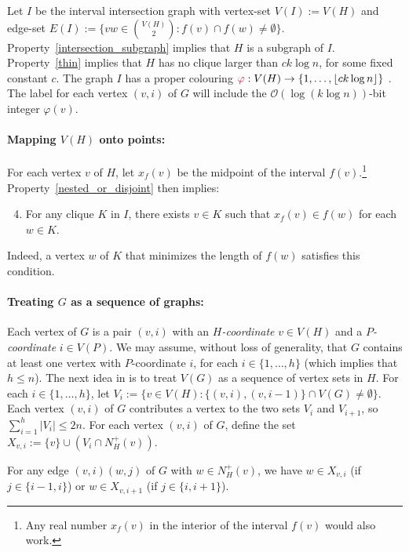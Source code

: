 \documentclass{patmorin}
\makeatletter
\renewcommand{\le}{\leqslant}
\newcommand{\defin}[1]{\emph{\textcolor{brightmaroon}{#1}}}
\def\mathcolor#1#{\@mathcolor{#1}}
\def\@mathcolor#1#2#3{%
  \protect\leavevmode
  \begingroup
    \color#1{#2}#3%
  \endgroup
}
\newcommand{\mathdefin}[1]{\mathcolor{brightmaroon}{#1}}
\newcommand{\Oh}{\mathcal{O}}
\makeatother
\begin{document}
  Let $I$ be the interval intersection graph with vertex-set $V(I):=V(H)$ and edge-set $E(I):=\{vw\in\binom{V(H)}{2}:f(v)\cap f(w)\neq\emptyset\}$.
  Property~\ref{intersection_subgraph} implies that $H$ is a subgraph of $I$. Property~\ref{thin} implies that $H$ has no clique larger than $ck\log n$, for some fixed constant $c$.
  The graph $I$ has a proper colouring $\mathdefin{\varphi}:V(H)\to\{1,\ldots,\lfloor ck\log n\rfloor\}$ \cite{gilmore.hoffman:characterization}.
  The label for each vertex $(v,i)$ of $G$ will include the $\Oh(\log (k\log n))$-bit integer $\varphi(v)$.

  \paragraph{\boldmath Mapping $V(H)$ onto points:}
  For each vertex $v$ of $H$, let $x_f(v)$ be the midpoint of the interval $f(v)$.\footnote{Any real number $x_f(v)$ in the interior of the interval $f(v)$ would also work.}  Property~\ref{nested_or_disjoint} then implies:
  \begin{enumerate}[nosep]\setcounter{enumi}{3}
      \item\label{clique_property} For any clique $K$ in $I$, there exists $v\in K$ such that $x_f(v)\in f(w)$ for each $w\in K$.
  \end{enumerate}
  Indeed, a vertex $w$ of $K$ that minimizes the length of $f(w)$ satisfies this condition.

  \paragraph{\boldmath Treating $G$ as a sequence of graphs:}
  Each vertex of $G$ is a pair $(v,i)$ with an \defin{$H$-coordinate} $v\in V(H)$ and a \defin{$P$-coordinate} $i\in V(P)$.
  We may assume, without loss of generality, that $G$ contains at least one vertex with $P$-coordinate $i$, for each $i\in\{1,\ldots,h\}$ (which implies that $h\le n$).
  The next idea in \cite{dujmovic.esperet.ea:adjacency} is to treat $V(G)$ as a sequence of vertex sets in $H$.
  For each $i\in\{1,\ldots,h\}$, let $V_i:=\{v\in V(H): \{(v,i),(v,i-1)\}\cap V(G)\neq\emptyset \}$.    Each vertex $(v,i)$ of $G$ contributes a vertex to the two sets $V_{i}$ and $V_{i+1}$, so $\sum_{i=1}^h |V_i|\le 2n$.  For each vertex $(v,i)$ of $G$, define the set $X_{v,i}:= \{v\}\cup (V_i\cap N^+_H(v))$.

  \begin{obs}\label{x_v_i_sufficient}
    For any edge $(v,i)(w,j)$ of $G$ with $w\in N^+_H(v)$, we have $w\in X_{v,i}$ (if $j\in\{i-1,i\}$) or $w\in X_{v,i+1}$ (if $j\in\{i,i+1\}$).
  \end{obs}
\end{document}
